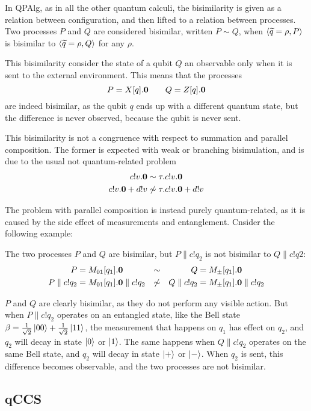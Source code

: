 In QPAlg, as in all the other quantum calculi, the bisimilarity is given as a relation between configuration, and then lifted to a relation between processes. Two processes $P$ and $Q$ are considered bisimilar, written $P \sim Q$, when $\langle\widetilde{q} = \rho, P\rangle$ is bisimilar to $\langle\widetilde{q} = \rho, Q\rangle$ for any $\rho$.

This bisimilarity consider the state of a qubit $Q$ an observable only when it is sent to the external environment. This means that the processes 
\[ P = X[q].\mathbf{0} \qquad Q = Z[q].\mathbf{0}\]
are indeed bisimilar, as the qubit $q$ ends up with a different quantum state, but the difference is never observed, because the qubit is never sent.

This bisimilarity is not a congruence with respect to summation and parallel composition. The former is expected with weak or branching bisimulation, and is due to the usual not quantum-related problem 
\begin{align*}
c!v.\mathbf{0} &\sim \tau.c!v.\mathbf{0} \\
c!v.\mathbf{0} + d!v &\not\sim \tau.c!v.\mathbf{0} + d!v
\end{align*}

The problem with parallel composition is instead purely quantum-related, as it is caused by the side effect of measurements and entanglement. Cnsider the following example:

\begin{example}
The two processes $P$ and $Q$ are bisimilar, but $P\parallel c!q_2$ is not bisimilar to $Q \parallel c!q2$:
\begin{align*}
 P &= M_{01}[q_1].\mathbf{0} &\sim & & Q &= M_\pm[q_1].\mathbf{0} \\ 
 P \parallel c!q_2 &=  M_{01}[q_1].\mathbf{0} \parallel c!q_2 &\not\sim & & Q \parallel c!q_2 &=  M_\pm[q_1].\mathbf{0} \parallel c!q_2 
\end{align*} 

$P$ and $Q$ are clearly bisimilar, as they do not perform any visible action. But when $P\parallel c!q_2$ operates on an entangled state, like the Bell state $\beta = \frac{1}{\sqrt{2}}\ket{00} + \frac{1}{\sqrt{2}}\ket{11}$, the measurement that happens on $q_1$ has effect on $q_2$, and $q_2$ will decay in state $\ket{0}$ or $\ket{1}$. The same happens when $Q\parallel c!q_2$ operates on the same Bell state, and $q_2$ will decay in state $\ket{+}$ or $\ket{-}$. When $q_2$ is sent, this difference becomes observable, and the two processes are not bisimilar.
\end{example}
\subsection{qCCS}

